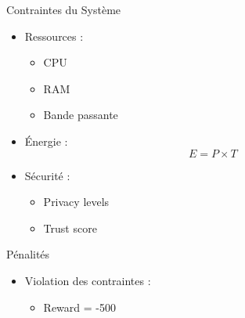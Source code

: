 \documentclass{beamer}
\begin{document}
\begin{frame}{Contraintes du Système}
\begin{itemize}
    \item Ressources :
    \begin{itemize}
        \item CPU
        \item RAM
        \item Bande passante
    \end{itemize}
    \item Énergie :
    \[
    E = P \times T
    \]
    \item Sécurité :
    \begin{itemize}
        \item Privacy levels
        \item Trust score
    \end{itemize}
\end{itemize}
\end{frame}

\begin{frame}{Pénalités}
\begin{itemize}
    \item Violation des contraintes :
    \begin{itemize}
        \item Reward = -500
    \end{itemize}
\end{itemize}
\end{frame}
\end{document}
